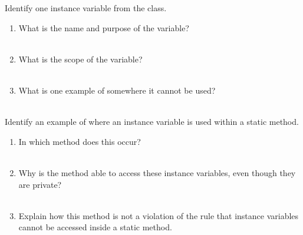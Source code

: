 \Q Identify one instance variable from the  class.
\begin{enumerate}
\item What is the name and purpose of the variable?
\\  \\[-2em]

\item What is the scope of the variable?
\\  \\[-2em]

\item What is one example of somewhere it cannot be used?
\\  \\[-2em]
\end{enumerate}


\newpage

\Q Identify an example of where an instance variable is used within a static method.
\begin{enumerate}
\item In which method does this occur?
\\  \\[-2em]

\item Why is the method able to access these instance variables, even though they are private?
\\  \\[-2em]

\item Explain how this method is not a violation of the rule that instance variables cannot be accessed inside a static method.
\\  \\[-2em]
\end{enumerate}


